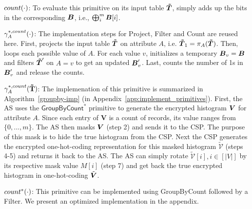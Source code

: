  $count(\cdot)$: To evaluate this primitive on its input table $\boldsymbol{\tilde{T}}$, \system simply  adds up the bits in the corresponding $\boldsymbol{B}$, i.e., $\bigoplus_{i}^m \boldsymbol{B}[i]$.

 $\gamma^{*,count}_{A}(\cdot)$: The implementation steps for \textsf{Project}, \textsf{Filter} and \textsf{Count} are reused here. First, \system projects the input table $\boldsymbol{\tilde{T}}$ on attribute $A$, i.e. $\boldsymbol{\tilde{T}}_1 = \pi_A(\boldsymbol{\tilde{T}})$. Then, \system loops each possible value of $A$. For each value $v$, \system initializes a temporary $\boldsymbol{B}_v=\boldsymbol{B}$ and filters $\boldsymbol{\tilde{T}}'$ on $A=v$ to get an updated $\boldsymbol{B}'_v$. Last, \system counts the number of 1s in $\boldsymbol{B}'_v$ and release the counts. 

 $\gamma^{*,count}_A(\mathbf{\tilde{T}})$: The implemenation of this primitive is summarized in Algorithm~\ref{groupby-imp} (in Appendix~\ref{app:implement_primitives}). First, the \textsf{AS} uses the $\textsf{GroupByCount}^*$ primitive to generate the encrypted histogram $\boldsymbol{V}$ for attribute $A$. Since each entry of $\mathbf{V}$ is a count of records, its value ranges from $\{0,...,m\}$. The \textsf{AS} then masks $\boldsymbol{V}$ (step 2) and sends it to the \textsf{CSP}. The purpose of this mask is to hide the true histogram from the \textsf{CSP}. Next the \textsf{CSP} generates the encrypted one-hot-coding representation for this masked histogram $\boldsymbol{\tilde{\mathcal{V}}}$ (steps 4-5) and returns it back to the \textsf{AS}. %
The \textsf{AS} can simply rotate $\boldsymbol{\tilde{\mathcal{V}}}[i], i \in [|V|]$ by its respective mask value $M[i]$ (step 7) and get back the true encrypted histogram in one-hot-coding $\tilde{\boldsymbol{V}}$.

  $count^*(\cdot)$: This primitive can be implemented using \textsf{GroupByCount} followed by a \textsf{Filter}. We present an optimized implementation in the appendix.





